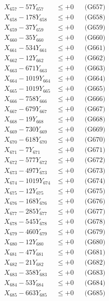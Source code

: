 \documentclass[a4paper,10pt]{article}
\begin{document}
{\begin{align}
X_{657} - 57Y_{657} &\leq +0 && \text{(G657)} \\
X_{658} - 178Y_{658} &\leq +0 && \text{(G658)} \\
X_{659} - 37Y_{659} &\leq +0 && \text{(G659)} \\
X_{660} - 35Y_{660} &\leq +0 && \text{(G660)} \\
\allowbreak
X_{661} - 534Y_{661} &\leq +0 && \text{(G661)} \\
X_{662} - 12Y_{662} &\leq +0 && \text{(G662)} \\
X_{663} - 671Y_{663} &\leq +0 && \text{(G663)} \\
X_{664} - 1019Y_{664} &\leq +0 && \text{(G664)} \\
X_{665} - 1019Y_{665} &\leq +0 && \text{(G665)} \\
X_{666} - 758Y_{666} &\leq +0 && \text{(G666)} \\
X_{667} - 679Y_{667} &\leq +0 && \text{(G667)} \\
X_{668} - 19Y_{668} &\leq +0 && \text{(G668)} \\
X_{669} - 730Y_{669} &\leq +0 && \text{(G669)} \\
X_{670} - 618Y_{670} &\leq +0 && \text{(G670)} \\
\allowbreak
X_{671} - 7Y_{671} &\leq +0 && \text{(G671)} \\
X_{672} - 577Y_{672} &\leq +0 && \text{(G672)} \\
X_{673} - 497Y_{673} &\leq +0 && \text{(G673)} \\
X_{674} - 1019Y_{674} &\leq +0 && \text{(G674)} \\
X_{675} - 12Y_{675} &\leq +0 && \text{(G675)} \\
X_{676} - 168Y_{676} &\leq +0 && \text{(G676)} \\
X_{677} - 285Y_{677} &\leq +0 && \text{(G677)} \\
X_{678} - 545Y_{678} &\leq +0 && \text{(G678)} \\
X_{679} - 460Y_{679} &\leq +0 && \text{(G679)} \\
X_{680} - 12Y_{680} &\leq +0 && \text{(G680)} \\
\allowbreak
X_{681} - 47Y_{681} &\leq +0 && \text{(G681)} \\
X_{682} - 21Y_{682} &\leq +0 && \text{(G682)} \\
X_{683} - 358Y_{683} &\leq +0 && \text{(G683)} \\
X_{684} - 53Y_{684} &\leq +0 && \text{(G684)} \\
X_{685} - 663Y_{685} &\leq +0 && \text{(G685)} \\

\end{align}}
\end{document}
